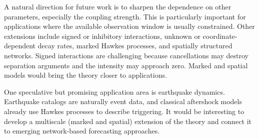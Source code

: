 \documentclass{article}
\begin{document}
A natural direction for future work is to sharpen the dependence on other parameters, especially the coupling strength.
This is particularly important for applications where the available observation window is usually constrained. 
Other extensions include signed or inhibitory interactions, unknown or coordinate-dependent decay rates, marked Hawkes processes, and spatially structured networks. 
Signed interactions are challenging because cancellations may destroy separation arguments and the intensity may approach zero. 
Marked and spatial models would bring the theory closer to applications.

One speculative but promising application area is earthquake dynamics. Earthquake catalogs are naturally event data, and classical aftershock models already use Hawkes processes to describe triggering. 
It would be interesting to develop a multiscale (marked and spatial) extension of the theory and connect it to emerging network-based forecasting approaches.








\appendix
\end{document}
